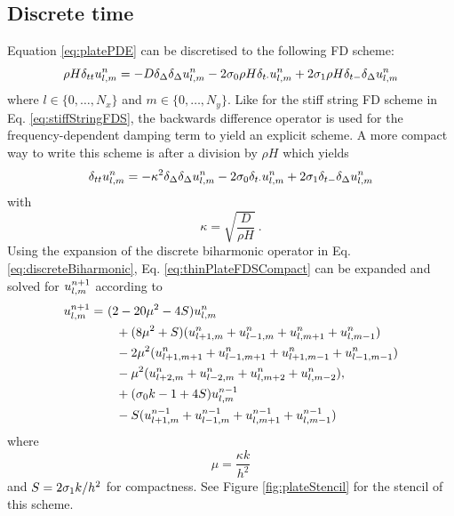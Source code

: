 \subsection{Discrete time}
Equation \eqref{eq:platePDE} can be discretised to the following FD scheme:
\begin{equation}\label{eq:thinPlateFDS}
    \rho H \delta_{tt} u_{l,m}^n = - D \delta_{\Delta}\delta_{\Delta}u_{l,m}^n - 2\sigma_{0} \rho H \delta_{t\cdot} u_{l,m}^n + 2 \sigma_{1} \rho H \delta_{t-} \delta_{\Delta}u_{l,m}^n
\end{equation}
where $l\in\{0, \hdots, N_x\}$ and $m\in\{0, \hdots, N_y\}$. Like for the stiff string FD scheme in Eq. \eqref{eq:stiffStringFDS}, the backwards difference operator is used for the frequency-dependent damping term to yield an explicit scheme. A more compact way to write this scheme is after a division by $\rho H$ which yields
\begin{equation}\label{eq:thinPlateFDSCompact}
    \delta_{tt} u_{l,m}^n = - \kappa^2\delta_{\Delta}\delta_{\Delta}u_{l,m}^n - 2\sigma_{0}\delta_{t\cdot} u_{l,m}^n + 2 \sigma_{1} \delta_{t-} \delta_{\Delta}u_{l,m}^n
\end{equation}
with
\begin{equation}\label{eq:kappaDef}
     \kappa = \sqrt{\frac{D}{\rho H}}\ .
\end{equation}
Using the expansion of the discrete biharmonic operator in Eq. \eqref{eq:discreteBiharmonic}, Eq. \eqref{eq:thinPlateFDSCompact} can be expanded and solved for $u_{l,m}^{n+1}$ according to
\begin{equation}\label{eq:plateUpdate}
    \begin{aligned}
    u_{l,m}^{n+1} =&\ (2-20\mu^2 - 4S)u_{l,m}^n \\
    &\ \ \ +(8\mu^2 + S)(u_{l+1, m}^n + u_{l-1, m}^n+u_{l, m+1}^n+u_{l, m-1}^n)\\
    &\ \ \ -2\mu^2(u_{l+1, m+1}^n + u_{l-1, m+1}^n+u_{l+1, m-1}^n+u_{l-1, m-1}^n)\\
    &\ \ \ -\mu^2(u_{l+2, m}^n + u_{l-2, m}^n+u_{l, m+2}^n+u_{l, m-2}^n),\\
    &\ \ \ + (\sigma_{0} k  - 1 + 4S) u_{l,m}^{n-1}\\
    &\ \ \ - S (u_{l+1, m}^{n-1} + u_{l-1, m}^{n-1}+u_{l, m+1}^{n-1}+u_{l, m-1}^{n-1})
    \end{aligned}
\end{equation}
where 
\begin{equation}
    \mu = \frac{\kappa k}{h^2}
\end{equation}
and $S = 2\sigma_{1} k / h^2$ for compactness. See Figure \ref{fig:plateStencil} for the stencil of this scheme.
\def\figSpacing{0.01\textwidth}
\def\figWidth{0.49\textwidth}
